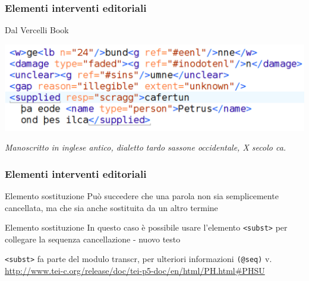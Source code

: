 \begin{frame}
    \frametitle{Elementi interventi editoriali}
    \addtocounter{nframe}{1}
    

    \begin{block}{Dal Vercelli Book}
         \begin{center}
            \includegraphics[width=.9\textwidth]{imgs/vercelli.png}
        \end{center}
    \end{block}
    \textit{Manoscritto in inglese antico, dialetto tardo sassone occidentale, X secolo ca.}

\end{frame}
  

\begin{frame}
    \frametitle{Elementi interventi editoriali}
    \addtocounter{nframe}{1}
    

    \begin{block}{Elemento sostituzione}
        Può succedere che una parola non sia semplicemente cancellata, ma che sia anche sostituita da un altro termine
    \end{block}
    \begin{block}{Elemento sostituzione}
        In questo caso è possibile usare l’elemento \texttt{<subst>} per collegare la sequenza cancellazione - nuovo testo
    \end{block}
    \texttt{<subst>} fa parte del modulo transcr, per ulteriori informazioni \texttt{(@seq)} v. \url{http://www.tei-c.org/release/doc/tei-p5-doc/en/html/PH.html\#PHSU}
\end{frame}


